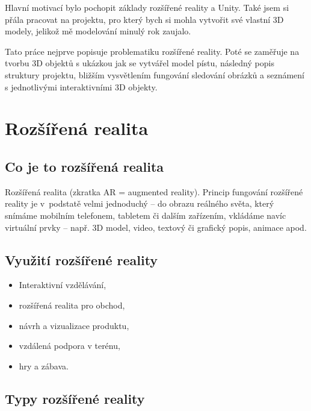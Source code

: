 \documentclass[12pt, a4paper,
twoside,        %
openright
]{report}
\let\oldchapter\chapter
\renewcommand{\chapter}{
	\clearpage
	\pagestyle{fancy}
	\oldchapter
}
\begin{document}
Hlavní motivací bylo pochopit základy rozšířené reality a Unity. Také jsem si přála pracovat na projektu, pro který bych si mohla vytvořit své vlastní 3D modely, jelikož mě modelování minulý rok zaujalo.  

Tato práce nejprve popisuje problematiku rozšířené reality. Poté se zaměřuje na tvorbu 3D objektů s ukázkou jak se vytvářel model pístu, následný popis struktury projektu, bližším vysvětlením fungování sledování obrázků a seznámení s jednotlivými interaktivními 3D objekty. 




 


\chapter{Rozšířená realita}

\section{Co je to rozšířená realita}
\label{sec:co_je_AR}
Rozšířená realita (zkratka AR = augmented reality). Princip fungování rozšířené reality je v~podstatě velmi jednoduchý – do obrazu reálného světa, který snímáme mobilním telefonem, tabletem či dalším zařízením, vkládáme navíc virtuální prvky – např. 3D model, video, textový či grafický popis, animace apod.


\section{Využití rozšířené reality}
\label{sec:vyuziti_AR}


\begin{itemize}
	\item Interaktivní vzdělávání,
	\item rozšířená realita pro obchod,
	\item návrh a vizualizace produktu,
	\item vzdálená podpora v terénu,
	\item hry a zábava.
\end{itemize}


\section{Typy rozšířené reality}
\label{sec:typy_AR}
\end{document}
